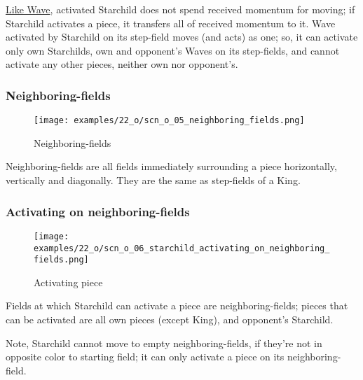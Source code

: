 \hyperref[fig:10_wave]{Like Wave}, activated Starchild does not spend received
momentum for moving; if Starchild activates a piece, it transfers all of received
momentum to it. Wave activated by Starchild on its step-field moves (and acts) as
one; so, it can activate only own Starchilds, own and opponent's Waves on its
step-fields, and cannot activate any other pieces, neither own nor opponent's.

\clearpage %

\subsubsection*{Neighboring-fields}

\noindent
\begin{wrapfigure}[5]{l}{0.4\textwidth}
\centering
\texttt{[image: examples/22\_o/scn\_o\_05\_neighboring\_fields.png]}
\caption{Neighboring-fields}
\label{fig:scn_o_05_neighboring_fields}
\end{wrapfigure}
Neighboring-fields are all fields immediately surrounding a piece horizontally,
vertically and diagonally. They are the same as step-fields of a King.

\vspace*{2.1\baselineskip}
\subsubsection*{Activating on neighboring-fields}

\noindent
\begin{wrapfigure}[7]{l}{0.4\textwidth}
\centering
\texttt{[image: examples/22\_o/scn\_o\_06\_starchild\_activating\_on\_neighboring\_fields.png]}
\caption{Activating piece}
\label{fig:scn_o_06_starchild_activating_on_neighboring_fields}
\end{wrapfigure}
Fields at which Starchild can activate a piece are neighboring-fields; pieces that
can be activated are all own pieces (except King), and opponent's Starchild.

Note, Starchild cannot move to empty neighboring-fields, if they're not in opposite
color to starting field; it can only activate a piece on its neighboring-field.

